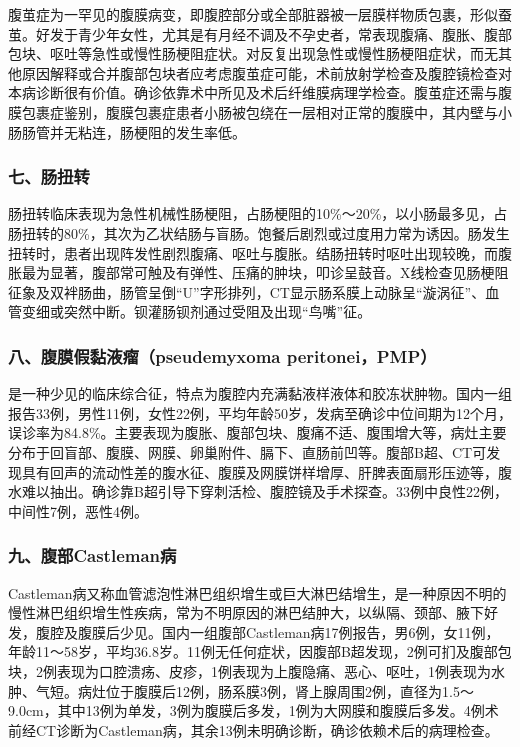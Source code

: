 腹茧症为一罕见的腹膜病变，即腹腔部分或全部脏器被一层膜样物质包裹，形似蚕茧。好发于青少年女性，尤其是有月经不调及不孕史者，常表现腹痛、腹胀、腹部包块、呕吐等急性或慢性肠梗阻症状。对反复出现急性或慢性肠梗阻症状，而无其他原因解释或合并腹部包块者应考虑腹茧症可能，术前放射学检查及腹腔镜检查对本病诊断很有价值。确诊依靠术中所见及术后纤维膜病理学检查。腹茧症还需与腹膜包裹症鉴别，腹膜包裹症患者小肠被包绕在一层相对正常的腹膜中，其内壁与小肠肠管并无粘连，肠梗阻的发生率低。

\subsubsection{七、肠扭转}

肠扭转临床表现为急性机械性肠梗阻，占肠梗阻的10\%～20\%，以小肠最多见，占肠扭转的80\%，其次为乙状结肠与盲肠。饱餐后剧烈或过度用力常为诱因。肠发生扭转时，患者出现阵发性剧烈腹痛、呕吐与腹胀。结肠扭转时呕吐出现较晚，而腹胀最为显著，腹部常可触及有弹性、压痛的肿块，叩诊呈鼓音。X线检查见肠梗阻征象及双袢肠曲，肠管呈倒“U”字形排列，CT显示肠系膜上动脉呈“漩涡征”、血管变细或突然中断。钡灌肠钡剂通过受阻及出现“鸟嘴”征。

\subsubsection{八、腹膜假黏液瘤（pseudemyxoma peritonei，PMP）}

是一种少见的临床综合征，特点为腹腔内充满黏液样液体和胶冻状肿物。国内一组报告33例，男性11例，女性22例，平均年龄50岁，发病至确诊中位间期为12个月，误诊率为84.8\%。主要表现为腹胀、腹部包块、腹痛不适、腹围增大等，病灶主要分布于回盲部、腹膜、网膜、卵巢附件、膈下、直肠前凹等。腹部B超、CT可发现具有回声的流动性差的腹水征、腹膜及网膜饼样增厚、肝脾表面扇形压迹等，腹水难以抽出。确诊靠B超引导下穿刺活检、腹腔镜及手术探查。33例中良性22例，中间性7例，恶性4例。

\subsubsection{九、腹部Castleman病}

Castleman病又称血管滤泡性淋巴组织增生或巨大淋巴结增生，是一种原因不明的慢性淋巴组织增生性疾病，常为不明原因的淋巴结肿大，以纵隔、颈部、腋下好发，腹腔及腹膜后少见。国内一组腹部Castleman病17例报告，男6例，女11例，年龄11～58岁，平均36.8岁。11例无任何症状，因腹部B超发现，2例可扪及腹部包块，2例表现为口腔溃疡、皮疹，1例表现为上腹隐痛、恶心、呕吐，1例表现为水肿、气短。病灶位于腹膜后12例，肠系膜3例，肾上腺周围2例，直径为1.5～9.0cm，其中13例为单发，3例为腹膜后多发，1例为大网膜和腹膜后多发。4例术前经CT诊断为Castleman病，其余13例未明确诊断，确诊依赖术后的病理检查。

